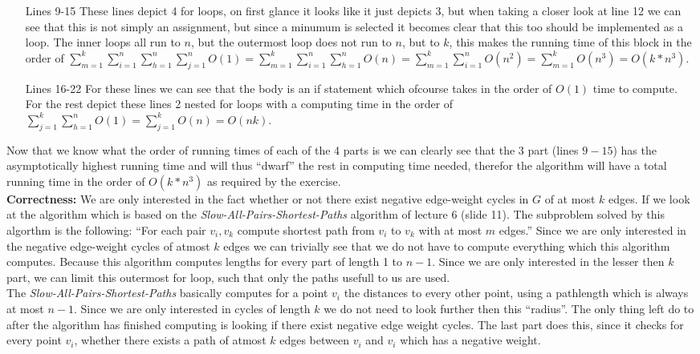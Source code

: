 \documentclass{article}
\begin{document}
\begin{itemize}
\begin{itemize}
\item[Lines 9-15] These lines depict 4 for loops, on first glance it looks like it just depicts 3, but when taking a closer look at line 12 we can see that this is not simply an assignment, but since a minumum is selected it becomes clear that this too should be implemented as a loop. The inner loops all run to $n$, but the outermost loop does not run to $n$, but to $k$, this makes the running time of this block in the order of $\sum_{m=1}^k{\sum_{i=1}^n{\sum_{h=1}^n{\sum_{j=1}^n{O(1)}}}}= \sum_{m=1}^k{\sum_{i=1}^n{\sum_{h=1}^n{O(n)}}}=\sum_{m=1}^k{\sum_{i=1}^n{O(n^2)}}= \sum_{m=1}^k{O(n^3)}=O(k*n^3)$.

\item[Lines 16-22] For these lines we can see that the body is an if statement which ofcourse takes in the order of $O(1)$ time to compute. For the rest depict these lines 2 nested for loops with a computing time in the order of $\sum_{j=1}^k{\sum_{h=1}^n{O(1)}}=\sum_{j=1}^k{O(n)}=O(nk)$.
\end{itemize}

Now that we know what the order of running times of each of the 4 parts is we can clearly see that the 3 part (lines $9-15$) has the asymptotically highest running time and will thus ``dwarf'' the rest in computing time needed, therefor the algorithm will have a total running time in the order of $O(k*n^3)$ as required by the exercise. \\

\textbf{Correctness:} We are only interested in the fact whether or not there exist negative edge-weight cycles in $G$ of at most $k$ edges. If we look at the algorithm which is based on the \emph{Slow-All-Pairs-Shortest-Paths} algorithm of lecture 6 (slide 11). The subproblem solved by this algorthm is the following: ``For each pair $v_i,v_k$ compute shortest path from $v_i$ to $v_k$ with at most $m$ edges.'' Since we are only interested in the negative edge-weight cycles of atmost $k$ edges we can trivially see that we do not have to compute everything which this algorithm computes. Because this algorithm computes lengths for every part of length 1 to $n-1$. Since we are only interested in the lesser then $k$ part, we can limit this outermost for loop, such that only the paths usefull to us are used. \\

The \emph{Slow-All-Pairs-Shortest-Paths} basically computes for a point $v_i$ the distances to every other point, using a pathlength which is always at most $n-1$. Since we are only interested in cycles of length $k$ we do not need to look further then this ``radius''. The only thing left do to after the algorithm has finished computing is looking if there exist negative edge weight cycles. The last part does this, since it checks for every point $v_i$, whether there exists a path of atmost $k$ edges between $v_i$ and $v_i$ which has a negative weight.

\end{itemize}	
\end{document}
